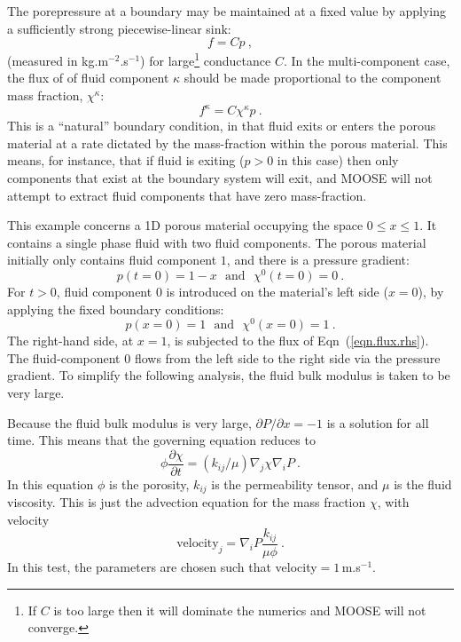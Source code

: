 The porepressure at a boundary may be maintained at a fixed value by
applying a sufficiently strong piecewise-linear sink:
\begin{equation}
f = Cp \ ,
\end{equation}
(measured in kg.m$^{-2}$.s$^{-1}$) for large\footnote{If $C$ is too
  large then it will dominate the numerics and MOOSE will not
  converge.} conductance $C$.  In the multi-component case, the flux
of of fluid component $\kappa$ should be made proportional to the
component mass fraction, $\chi^{\kappa}$:
\begin{equation}
f^{\kappa} = C\chi^{\kappa}p \ .
\label{eqn.flux.rhs}
\end{equation}
This is a ``natural'' boundary condition, in that fluid exits or
enters the porous material at a rate dictated by the mass-fraction
within the porous material.  This means, for instance, that if fluid
is exiting ($p>0$ in this case) then only components that exist at the
boundary system will exit, and MOOSE will not attempt to extract fluid
components that have zero mass-fraction.

This example concerns a 1D porous material occupying the space $0\leq
x \leq 1$.  It contains a single phase fluid with two
fluid components.  The porous material initially only contains fluid
component $1$, and there is a pressure gradient:
\begin{equation}
p(t=0) = 1 - x \ \ \ \mbox{and}\ \ \ \chi^{0}(t=0) = 0 \ .
\end{equation}
For $t>0$, fluid component $0$ is introduced on the material's left
side ($x=0$), by applying the fixed boundary conditions:
\begin{equation}
p(x=0) = 1 \ \ \ \mbox{and}\ \ \ \chi^{0}(x=0) = 1 \ .
\end{equation}
The right-hand side, at $x=1$, is subjected to the flux of
Eqn~(\ref{eqn.flux.rhs}).  The fluid-component $0$ flows from the left
side to the right side via the pressure gradient.  To simplify the
following analysis, the fluid bulk modulus is taken to be very large.

Because the fluid bulk modulus is very large, $\partial P/\partial x = -1$ is a
solution for all time.  This means that the governing equation reduces
to
\begin{equation}
\phi \frac{\partial \chi}{\partial t} =  (k_{ij}/\mu) \nabla_{j}
\chi \nabla_{i}P \ .
\end{equation}
In this equation $\phi$ is the porosity, $k_{ij}$ is the permeability
tensor, and $\mu$ is the fluid viscosity.  This is just the advection
equation for the mass fraction $\chi$, with velocity
\begin{equation}
\mbox{velocity}_{j} = \nabla_{i}P\frac{k_{ij}}{\mu\phi} \ .
\end{equation}
In this test, the parameters are chosen such that velocity$=1$\,m.s$^{-1}$.

